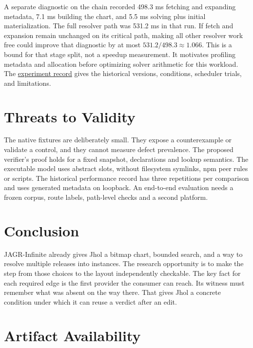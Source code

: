 \documentclass[
  11pt,
  letterpaper,
]{article}
\begin{document}
A separate diagnostic on the chain recorded 498.3 ms fetching and
expanding metadata, 7.1 ms building the chart, and 5.5 ms solving plus
initial materialization. The full resolver path was 531.2 ms in that
run. If fetch and expansion remain unchanged on its critical path,
making all other resolver work free could improve that diagnostic by at
most \(531.2/498.3\approx1.066\). This is a bound for that stage split,
not a speedup measurement. It motivates profiling metadata and
allocation before optimizing solver arithmetic for this workload. The
\href{../research/JAGR_INFINITE_MATH_ONLY_BENCHMARK_RECORD.md}{experiment
record} gives the historical versions, conditions, scheduler trials, and
limitations.

\section{Threats to Validity}\label{threats-to-validity}

The native fixtures are deliberately small. They expose a counterexample
or validate a control, and they cannot measure defect prevalence. The
proposed verifier's proof holds for a fixed snapshot, declarations and
lookup semantics. The executable model uses abstract slots, without
filesystem symlinks, npm peer rules or scripts. The historical
performance record has three repetitions per comparison and uses
generated metadata on loopback. An end-to-end evaluation needs a frozen
corpus, route labels, path-level checks and a second platform.

\section{Conclusion}\label{conclusion}

JAGR-Infinite already gives Jhol a bitmap chart, bounded search, and a
way to resolve multiple releases into instances. The research
opportunity is to make the step from those choices to the layout
independently checkable. The key fact for each required edge is the
first provider the consumer can reach. Its witness must remember what
was absent on the way there. That gives Jhol a concrete condition under
which it can reuse a verdict after an edit.

\section*{Artifact Availability}\label{artifact-availability}
\end{document}
